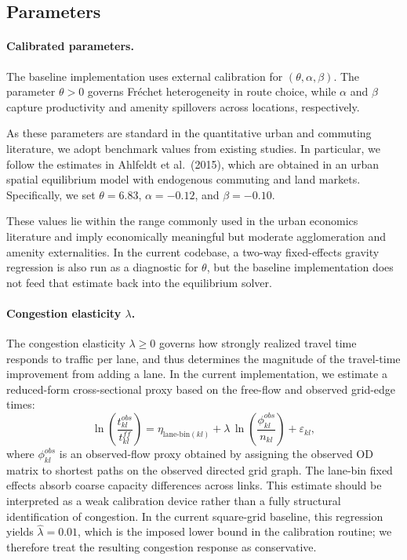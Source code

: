 \documentclass[12pt]{article}
\begin{document}
	\subsection{Parameters}
	
	\paragraph{Calibrated parameters.}
	The baseline implementation uses external calibration for $(\theta,\alpha,\beta)$.
	The parameter $\theta>0$ governs Fr\'echet heterogeneity in route choice, while
	$\alpha$ and $\beta$ capture productivity and amenity spillovers across locations,
	respectively.

	As these parameters are standard in the quantitative urban and commuting literature, we adopt benchmark values from existing studies. In particular, we follow the estimates in Ahlfeldt et al.\ (2015), which are obtained in an urban spatial equilibrium model with endogenous commuting and land markets.
	Specifically, we set $\theta = 6.83$, $\alpha = -0.12$, and $\beta = -0.10$.

	These values lie within the range commonly used in the urban economics literature and imply economically meaningful but moderate agglomeration and amenity externalities. In the current codebase, a two-way fixed-effects gravity regression is also run as a diagnostic for $\theta$, but the baseline implementation does not feed that estimate back into the equilibrium solver.

	\paragraph{Congestion elasticity $\lambda$.}
	The congestion elasticity $\lambda\geq 0$ governs how strongly realized travel time responds to traffic per lane, and thus determines the magnitude of the travel-time improvement from adding a lane. In the current implementation, we estimate a reduced-form cross-sectional proxy based on the free-flow and observed grid-edge times:
	\begin{equation}\label{eq:est_lambda}
		\ln\!\left(\frac{t_{kl}^{obs}}{t_{kl}^{ff}}\right)
		=
		\eta_{\mathrm{lane\text{-}bin}(kl)}
		+
		\lambda\,\ln\!\left(\frac{\phi_{kl}^{obs}}{n_{kl}}\right)
		+ \varepsilon_{kl},
	\end{equation}
	where $\phi_{kl}^{obs}$ is an observed-flow proxy obtained by assigning the observed OD matrix to shortest paths on the observed directed grid graph. The lane-bin fixed effects absorb coarse capacity differences across links. This estimate should be interpreted as a weak calibration device rather than a fully structural identification of congestion.
	In the current square-grid baseline, this regression yields $\hat\lambda=0.01$, which is the imposed lower bound in the calibration routine; we therefore treat the resulting congestion response as conservative.
\end{document}
